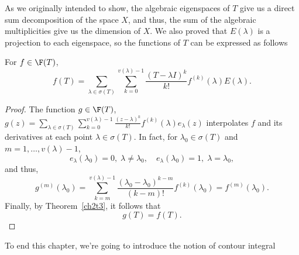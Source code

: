 As we originally intended to show, the algebraic eigenspaces of $T$ give us a direct sum decomposition of the space $X$, and thus, the sum of the algebraic multiplicities give us the dimension of $X$. We also proved that $E(\lambda)$ is a projection to each eigenspace, so the functions of $T$ can be expressed as follows

\begin{theorem}
    For $f \in \F(T)$,
    \[ f(T) = \sum_{\lambda \in \sigma(T)} \sum_{k = 0}^{v(\lambda)-1} \frac{(T-\lambda I)^k}{k!} f^{(k)}(\lambda) E(\lambda). \]
\end{theorem}

\begin{proof}
    The function $g \in \F(T)$, $g(z) = \sum_{\lambda \in \sigma(T)} \sum_{k = 0}^{v(\lambda)-1} \frac{(z-\lambda)^k}{k!} f^{(k)}(\lambda) e_\lambda(z)$ interpolates $f$ and its derivatives at each point $\lambda \in \sigma(T)$. In fact, for $\lambda_0 \in \sigma(T)$ and $m = 1,\ldots, v(\lambda) - 1$, 
    \[ e_\lambda(\lambda_0) = 0,\; \lambda \neq \lambda_0,\quad e_\lambda(\lambda_0) = 1,\; \lambda = \lambda_0,  \]
    and thus,
    \[ g^{(m)}(\lambda_0) = \sum_{k = m}^{v(\lambda)-1} \frac{(\lambda_0-\lambda_0)^{k-m}}{(k-m)!} f^{(k)}(\lambda_0) = f^{(m)}(\lambda_0).\]
    Finally, by Theorem~\ref{ch2t3}, it follows that
    \[ g(T) = f(T). \]
\end{proof}

To end this chapter, we're going to introduce the notion of contour integral